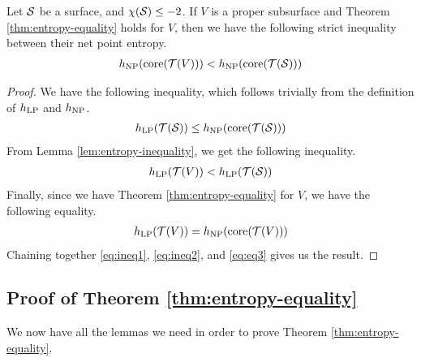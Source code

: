 \begin{lemma}
  \label{lem:net-point-entropy-inequality}
  Let $\mathcal{S}$ be a surface, and $\chi(\mathcal{S}) \leq -2$. If $V$ is a proper subsurface and Theorem \ref{thm:entropy-equality} holds for $V$, then we have the following strict inequality between their net point entropy.
  \begin{align*}
    h_{\mathrm{NP}}(\mathrm{core}(\mathcal{T}(V))) < h_{\mathrm{NP}}(\mathrm{core}(\mathcal{T}(\mathcal{S})))
  \end{align*}
\end{lemma}

\begin{proof}
  We have the following inequality, which follows trivially from the definition of $h_{\mathrm{LP}}$ and $h_{\mathrm{NP}}$.
  \begin{align}
    \label{eq:ineq1}
    h_{\mathrm{LP}}(\mathcal{T}(\mathcal{S})) \leq h_{\mathrm{NP}}(\mathrm{core}(\mathcal{T}(\mathcal{S})))
  \end{align}
  From Lemma \ref{lem:entropy-inequality}, we get the following inequality.
  \begin{align}
    \label{eq:ineq2}
    h_{\mathrm{LP}}(\mathcal{T}(V)) < h_{\mathrm{LP}}(\mathcal{T}(\mathcal{S}))
  \end{align}
  Finally, since we have Theorem \ref{thm:entropy-equality} for $V$, we have the following equality.
  \begin{align}
    \label{eq:eq3}
    h_{\mathrm{LP}}(\mathcal{T}(V)) = h_{\mathrm{NP}}(\mathrm{core}(\mathcal{T}(V)))
  \end{align}
  Chaining together \eqref{eq:ineq1}, \eqref{eq:ineq2}, and \eqref{eq:eq3} gives us the result.
\end{proof}

\subsection{Proof of Theorem \ref{thm:entropy-equality}}
\label{sec:proof-theorem}

We now have all the lemmas we need in order to prove Theorem \ref{thm:entropy-equality}.


